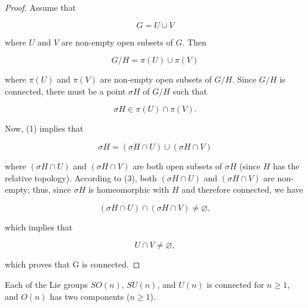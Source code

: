 \begin{proof}
Assume that

\begin{equation}
\tag{1}\label{eq:3.66:1}
G=U\cup V
\end{equation}

where $U$ and $V$ are non-empty open subsets of $G$. Then

\begin{equation}
\tag{2}\label{eq:3.66:2}
G/H=\pi(U)\cup\pi(V)
\end{equation}

where $\pi(U)$ and $\pi(V)$ are non-empty open subsets of $G/H$. Since $G/H$ is connected, there must be a point $\sigma H$ of $G/H$ such that

\begin{equation}
\tag{3}\label{eq:3.66:3}
\sigma H\in\pi(U)\cap\pi(V).
\end{equation}

Now, (1) implies that

\begin{equation}
\tag{4}\label{eq:3.66:4}
\sigma H=(\sigma H\cap U)\cup(\sigma H\cap V)
\end{equation}

where $(\sigma H \cap U)$ and $(\sigma H \cap V)$ are both open subsets of $\sigma H$ (since $H$ has the relative topology). According to (3), both $(\sigma H \cap U)$ and $(\sigma H \cap V)$ are non-empty; thus, since $\sigma H$ is homeomorphic with $H$ and therefore connected, we have

\begin{equation}
\tag{5}\label{eq:3.66:5}
(\sigma H\cap U)\cap(\sigma H\cap V)\neq\varnothing,
\end{equation}

which implies that

\begin{equation}
\tag{6}\label{eq:3.66:6}
U\cap V\neq\varnothing,
\end{equation}

which proves that G is connected.

\end{proof}

\begin{theorem}\label{thm:3.67}
Each of the Lie groups $SO(n)$, $SU(n)$, and $U(n)$ is connected for $n\geq1$, and $O(n)$ has two components ($n\geq1$).

\end{theorem}

